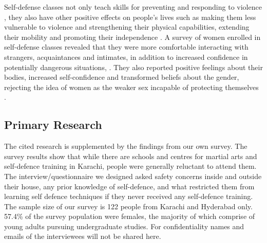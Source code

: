 Self-defense classes not only teach skills for preventing and responding to violence \cite{hollander}, they also have other positive effects on people’s lives such as making them less vulnerable to violence and strengthening their physical capabilities, extending their mobility and promoting their independence \cite{selfDefenseMovement}. A survey of women enrolled in self-defense classes revealed that they were more comfortable interacting with strangers, acquaintances and intimates, in addition to increased confidence in potentially dangerous situations, \cite{hollander}. They also reported positive feelings about their bodies, increased self-confidence and transformed beliefs about the gender, rejecting the idea of women as the weaker sex incapable of protecting themselves \cite{hollander}.

\subsection{Primary Research}

The cited research is supplemented by the findings from our own survey. The survey results show that while there are schools and centres for martial arts and self-defence training in Karachi, people were generally reluctant to attend them. The interview/questionnaire we designed asked safety concerns inside and outside their house, any prior knowledge of self-defence, and what restricted them from learning self defence techniques if they never received any self-defence training. The sample size of our survey is 122 people from Karachi and Hyderabad only. 57.4\% of the survey population were females, the majority of which comprise of young adults pursuing undergraduate studies. For confidentiality names and emails of the interviewees will not be shared here.

